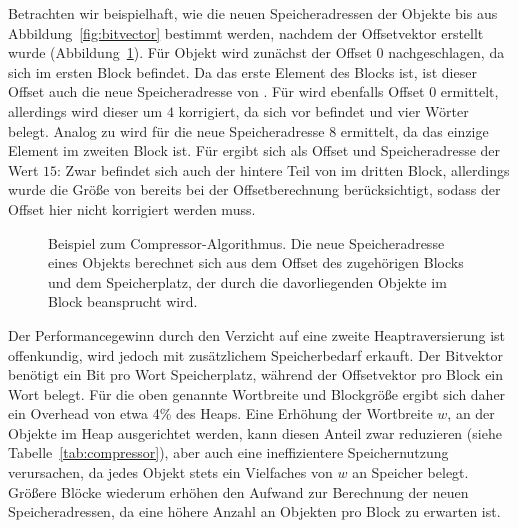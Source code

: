 Betrachten wir beispielhaft, wie die neuen Speicheradressen der Objekte  bis  aus Abbildung~\ref{fig:bitvector} bestimmt werden, nachdem der Offsetvektor erstellt wurde (Abbildung~\ref{fig:compressor-example}).
Für Objekt  wird zunächst der Offset $0$ nachgeschlagen, da sich  im ersten Block befindet.
Da  das erste Element des Blocks ist, ist dieser Offset auch die neue Speicheradresse von .
Für  wird ebenfalls Offset $0$ ermittelt, allerdings wird dieser um $4$ korrigiert, da sich  vor  befindet und vier Wörter belegt.
Analog zu  wird für  die neue Speicheradresse $8$ ermittelt, da  das einzige Element im zweiten Block ist.
Für  ergibt sich als Offset und Speicheradresse der Wert $15$:
Zwar befindet sich auch der hintere Teil von  im dritten Block, allerdings wurde die Größe von  bereits bei der Offsetberechnung berücksichtigt, sodass der Offset hier nicht korrigiert werden muss.


\begin{figure}[h]
	\centering
	
	\caption[Beispiel zum Compressor-Algorithmus]{Beispiel zum Compressor-Algorithmus. Die neue Speicheradresse eines Objekts berechnet sich aus dem Offset des zugehörigen Blocks und dem Speicherplatz, der durch die davorliegenden Objekte im Block beansprucht wird.}
	\label{fig:compressor-example}
\end{figure}

Der Performancegewinn durch den Verzicht auf eine zweite Heaptraversierung ist offenkundig, wird jedoch mit zusätzlichem Speicherbedarf erkauft.
Der Bitvektor benötigt ein Bit pro Wort Speicherplatz, während der Offsetvektor pro Block ein Wort belegt.
Für die oben genannte Wortbreite und Blockgröße ergibt sich daher ein Overhead von etwa 4\% des Heaps.
Eine Erhöhung der Wortbreite $w$, an der Objekte im Heap ausgerichtet werden, kann diesen Anteil zwar reduzieren (siehe Tabelle~\ref{tab:compressor}), aber auch eine ineffizientere Speichernutzung verursachen, da jedes Objekt stets ein Vielfaches von $w$ an Speicher belegt.
Größere Blöcke wiederum erhöhen den Aufwand zur Berechnung der neuen Speicheradressen, da eine höhere Anzahl an Objekten pro Block zu erwarten ist.


